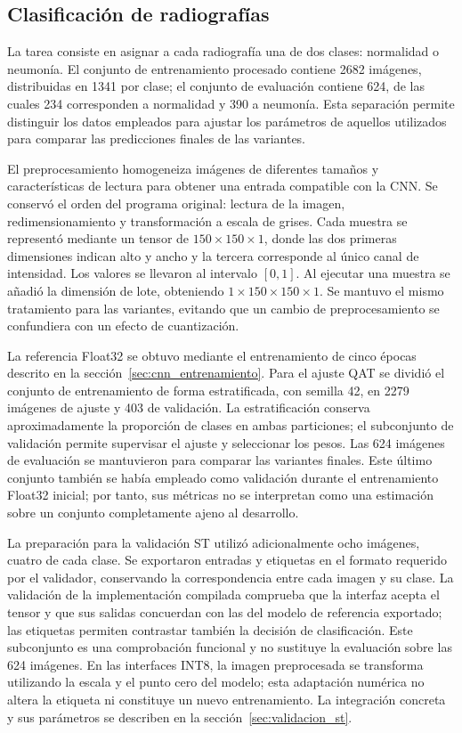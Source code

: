 \subsection{Clasificación de radiografías}\label{sec:cnn_base}

La tarea consiste en asignar a cada radiografía una de dos clases: normalidad o neumonía. El conjunto de entrenamiento procesado contiene 2682 imágenes, distribuidas en 1341 por clase; el conjunto de evaluación contiene 624, de las cuales 234 corresponden a normalidad y 390 a neumonía. Esta separación permite distinguir los datos empleados para ajustar los parámetros de aquellos utilizados para comparar las predicciones finales de las variantes.

El preprocesamiento homogeneiza imágenes de diferentes tamaños y características de lectura para obtener una entrada compatible con la CNN. Se conservó el orden del programa original: lectura de la imagen, redimensionamiento y transformación a escala de grises. Cada muestra se representó mediante un tensor de $150\times150\times1$, donde las dos primeras dimensiones indican alto y ancho y la tercera corresponde al único canal de intensidad. Los valores se llevaron al intervalo $[0,1]$. Al ejecutar una muestra se añadió la dimensión de lote, obteniendo $1\times150\times150\times1$. Se mantuvo el mismo tratamiento para las variantes, evitando que un cambio de preprocesamiento se confundiera con un efecto de cuantización.

La referencia Float32 se obtuvo mediante el entrenamiento de cinco épocas descrito en la sección~\ref{sec:cnn_entrenamiento}. Para el ajuste QAT se dividió el conjunto de entrenamiento de forma estratificada, con semilla 42, en 2279 imágenes de ajuste y 403 de validación. La estratificación conserva aproximadamente la proporción de clases en ambas particiones; el subconjunto de validación permite supervisar el ajuste y seleccionar los pesos. Las 624 imágenes de evaluación se mantuvieron para comparar las variantes finales. Este último conjunto también se había empleado como validación durante el entrenamiento Float32 inicial; por tanto, sus métricas no se interpretan como una estimación sobre un conjunto completamente ajeno al desarrollo.

La preparación para la validación ST utilizó adicionalmente ocho imágenes, cuatro de cada clase. Se exportaron entradas y etiquetas en el formato requerido por el validador, conservando la correspondencia entre cada imagen y su clase. La validación de la implementación compilada comprueba que la interfaz acepta el tensor y que sus salidas concuerdan con las del modelo de referencia exportado; las etiquetas permiten contrastar también la decisión de clasificación. Este subconjunto es una comprobación funcional y no sustituye la evaluación sobre las 624 imágenes. En las interfaces INT8, la imagen preprocesada se transforma utilizando la escala y el punto cero del modelo; esta adaptación numérica no altera la etiqueta ni constituye un nuevo entrenamiento. La integración concreta y sus parámetros se describen en la sección~\ref{sec:validacion_st}.

